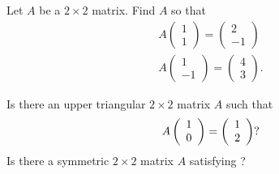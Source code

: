 \begin{exercise} \label{c4.1.8}
Let $A$ be a $2\times 2$ matrix.  Find $A$ so that
\begin{eqnarray*}
A\left(\begin{array}{r} 1 \\ 1 \end{array}\right) =
\left(\begin{array}{r} 2 \\ -1 \end{array}\right) \\
A\left(\begin{array}{r} 1 \\ -1 \end{array}\right) =
\left(\begin{array}{r} 4 \\ 3 \end{array}\right).
\end{eqnarray*}
\end{exercise}

\begin{exercise} \label{c4.1.9}
Is there an upper triangular $2\times 2$ matrix $A$ such that
\begin{equation}  \label{eq:avect}
A\left(\begin{array}{r} 1 \\ 0\end{array}\right) = \left(\begin{array}{r} 1 \\ 2\end{array}\right)?
\end{equation}
Is there a symmetric $2\times 2$ matrix $A$ satisfying ?
\end{exercise}

\CEXER

